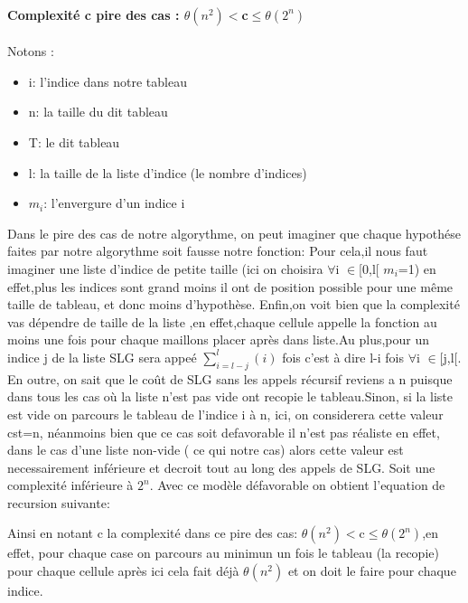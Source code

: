 \documentclass{article}
\begin{document}
\paragraph{Complexit\'e c pire des cas : $\theta(n^2) <$c$\leq\theta(2^n)$\\ }
 Notons :
\begin{itemize}
\item i: l'indice dans notre tableau
\item n: la taille du dit tableau
\item T: le dit tableau
\item l: la taille de la liste d'indice (le nombre d'indices)
\item $m_i$: l'envergure d'un indice i
\end{itemize}
Dans le pire des cas de notre algorythme, on peut imaginer que chaque hypoth\'ese faites par notre algorythme soit fausse notre fonction: Pour cela,il nous faut imaginer une liste d'indice de petite taille (ici on choisira $\forall$i $\in$[0,l[ $m_i$=1) en effet,plus les indices sont grand moins il ont de position possible pour une m\^eme taille de tableau, et donc moins d'hypothèse.
\newline Enfin,on voit bien que la complexit\'e vas d\'ependre de taille de la liste ,en effet,chaque cellule appelle la fonction au moins une fois pour chaque maillons placer après dans liste.Au plus,pour un indice j de la liste SLG sera appe\'e $\sum_{i=l-j}^{l} (i)$ fois c'est \`a dire l-i fois $\forall$i $\in$[j,l[.
\newline En outre, on sait que le co\^ut de SLG sans les appels r\'ecursif reviens a n puisque dans tous les cas o\`u la liste n'est pas vide ont recopie le tableau.Sinon, si la liste est vide on parcours le tableau de l'indice i \`a n, ici, on considerera cette valeur cst=n, n\'eanmoins bien que ce cas soit defavorable il n'est pas r\'ealiste en effet, dans le cas d'une liste non-vide ( ce qui notre cas) alors cette valeur est necessairement inf\'erieure et decroit tout au long des appels de SLG.
Soit une complexit\'e inf\'erieure \`a $2^n$.
\newline
Avec ce modèle d\'efavorable on obtient l'equation de recursion suivante:
\begin{center}
\end{center}
Ainsi en notant c la complexit\'e dans ce pire des cas: $\theta(n^2) <$c$\leq\theta(2^n)$,en effet, pour chaque case on parcours au minimun un fois le tableau (la recopie) pour chaque cellule après ici cela fait d\'ej\`a $\theta(n^2)$ et on doit le faire pour chaque indice.
\end{document}
